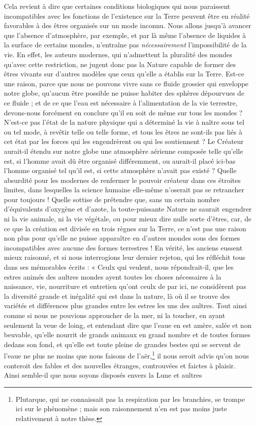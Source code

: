 \documentclass[a4paper, 11pt, oneside]{article}
\begin{document}
Cela revient à dire que certaines conditions biologiques qui nous paraissent incompatibles avec les fonctions de l'existence sur la Terre peuvent être en réalité favorables à des êtres organisés sur un mode inconnu. Nous allons jusqu'à avancer que l'absence d'atmosphère, par exemple, et par là même l'absence de liquides à la surface de certains mondes, n'entraîne pas \emph{nécessairement} l'impossibilité de la vie. En effet, les auteurs modernes, qui n'admettent la pluralité des mondes qu'avec cette restriction, ne jugent donc pas la Nature capable de former des êtres vivants sur d'autres modèles que ceux qu'elle a établis sur la Terre. Est-ce une raison, parce que nous ne pouvons vivre sans ce fluide grossier qui enveloppe notre globe, qu'aucun être possible ne puisse habiter des sphères dépourvues de ce fluide ; et de ce que l'eau est nécessaire à l'alimentation de la vie terrestre, devons-nous forcément en conclure qu'il en soit de même sur tous les mondes ? N'est-ce pas l'état de la nature physique qui a déterminé la vie à naître sous tel ou tel mode, à revêtir telle ou telle forme, et tous les êtres ne sont-ils pas liés à cet état par les forces qui les engendrèrent ou qui les soutiennent ? Le Créateur aurait-il étendu sur notre globe une atmosphère aérienne composée telle qu'elle est, si l'homme avait dû être organisé différemment, ou aurait-il placé ici-bas l'homme organisé tel qu'il est, si cette atmosphère n'avait pas existé ? Quelle absurdité pour les modernes de renfermer le pouvoir créateur dans ces étroites limites, dans lesquelles la science humaine elle-même n'oserait pas se retrancher pour toujours ! Quelle sottise de prétendre que, sans un certain nombre d'équivalents d'oxygène et d'azote, la toute-puissante Nature ne saurait engendrer ni la vie animale, ni la vie végétale, ou pour mieux dire nulle sorte d'êtres, car, de ce que la création est divisée en trois règnes sur la Terre, ce n'est pas une raison non plus pour qu'elle ne puisse apparaître en d'autres mondes sous des formes incompatibles avec aucune des formes terrestres ! En vérité, les anciens eussent mieux raisonné, et si nous interrogions leur dernier rejeton, qui les réfléchit tous dans ses mémorables écrits : « Ceulx qui veulent, nous répondrait-il, que les estres animés des aultres mondes ayent toutes les choses nécessaires à la naissance, vie, nourriture et entretien qu'ont ceulx de par ici, ne considèrent pas la diversité grande et inégalité qui est dans la nature, là où il se trouve des variétés et différences plus grandes entre les estres les uns des aultres. Tout ainsi comme si nous ne pouvions approucher de la mer, ni la toucher, en ayant seulement la veue de loing, et entendant dire que l'eaue en est amère, salée et non beuvable, qu'elle nourrit de grands animaux en grand nombre et de toutes formes dedans son fond, et qu'elle est toute pleine de grandes bestes qui se servent de l'eaue ne plus ne moins que nous faisons de l'aër,\footnote{Plutarque, qui ne connaissait pas la respiration par les branchies, se trompe ici sur le phénomène ; mais son raisonnement n'en est pas moins juste relativement à notre thèse.} il nous seroit advis qu'on nous conteroit des fables et des nouvelles étranges, controuvées et faictes à plaisir. Ainsi semble-il que nous soyons disposés envers la Lune et aultres 
\end{document}
